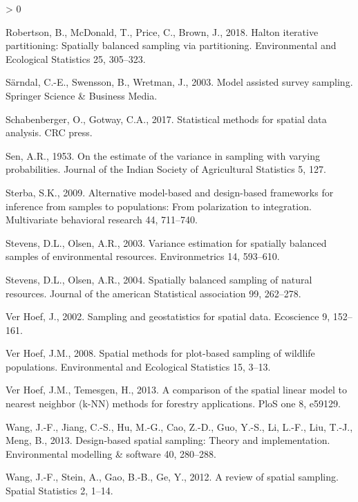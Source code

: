 \documentclass[]{elsarticle} %
\newlength{\cslhangindent}
\newenvironment{CSLReferences}[2] %
 {%
  \setlength{\parindent}{0pt}
  \ifodd #1 \everypar{\setlength{\hangindent}{\cslhangindent}}\ignorespaces\fi
  \ifnum #2 > 0
  \setlength{\parskip}{#2\baselineskip}
  \fi
 }%
 {}
\begin{document}
\begin{CSLReferences}{1}{0}
\leavevmode\hypertarget{ref-robertson2018halton}{}%
Robertson, B., McDonald, T., Price, C., Brown, J., 2018. Halton
iterative partitioning: Spatially balanced sampling via partitioning.
Environmental and Ecological Statistics 25, 305--323.

\leavevmode\hypertarget{ref-sarndal2003model}{}%
Särndal, C.-E., Swensson, B., Wretman, J., 2003. Model assisted survey
sampling. Springer Science \& Business Media.

\leavevmode\hypertarget{ref-schabenberger2017statistical}{}%
Schabenberger, O., Gotway, C.A., 2017. Statistical methods for spatial
data analysis. CRC press.

\leavevmode\hypertarget{ref-sen1953estimate}{}%
Sen, A.R., 1953. On the estimate of the variance in sampling with
varying probabilities. Journal of the Indian Society of Agricultural
Statistics 5, 127.

\leavevmode\hypertarget{ref-sterba2009alternative}{}%
Sterba, S.K., 2009. Alternative model-based and design-based frameworks
for inference from samples to populations: From polarization to
integration. Multivariate behavioral research 44, 711--740.

\leavevmode\hypertarget{ref-stevens2003variance}{}%
Stevens, D.L., Olsen, A.R., 2003. Variance estimation for spatially
balanced samples of environmental resources. Environmetrics 14,
593--610.

\leavevmode\hypertarget{ref-stevens2004spatially}{}%
Stevens, D.L., Olsen, A.R., 2004. Spatially balanced sampling of natural
resources. Journal of the american Statistical association 99, 262--278.

\leavevmode\hypertarget{ref-verhoef2002sampling}{}%
Ver Hoef, J., 2002. Sampling and geostatistics for spatial data.
Ecoscience 9, 152--161.

\leavevmode\hypertarget{ref-verhoef2008spatial}{}%
Ver Hoef, J.M., 2008. Spatial methods for plot-based sampling of
wildlife populations. Environmental and Ecological Statistics 15, 3--13.

\leavevmode\hypertarget{ref-ver2013comparison}{}%
Ver Hoef, J.M., Temesgen, H., 2013. A comparison of the spatial linear
model to nearest neighbor (k-NN) methods for forestry applications. PloS
one 8, e59129.

\leavevmode\hypertarget{ref-wang2013design}{}%
Wang, J.-F., Jiang, C.-S., Hu, M.-G., Cao, Z.-D., Guo, Y.-S., Li, L.-F.,
Liu, T.-J., Meng, B., 2013. Design-based spatial sampling: Theory and
implementation. Environmental modelling \& software 40, 280--288.

\leavevmode\hypertarget{ref-wang2012review}{}%
Wang, J.-F., Stein, A., Gao, B.-B., Ge, Y., 2012. A review of spatial
sampling. Spatial Statistics 2, 1--14.

\end{CSLReferences}
\end{document}
